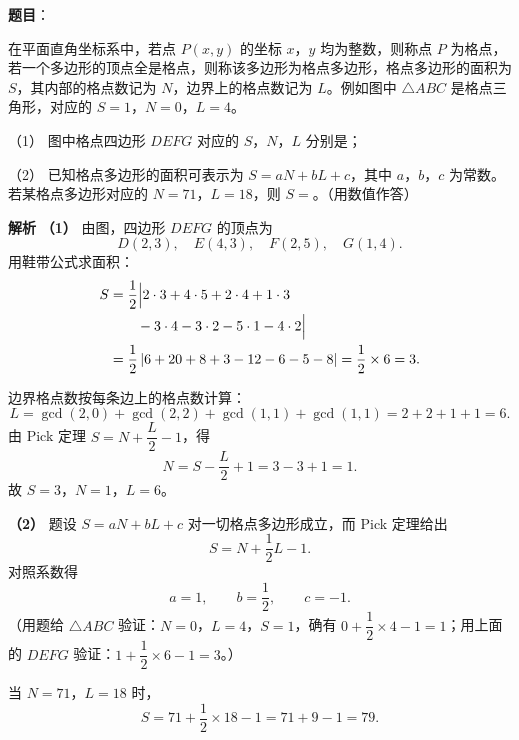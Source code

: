\begin{answer}

\textbf{题目}：

在平面直角坐标系中，若点 $P(x,y)$ 的坐标 $x$，$y$ 均为整数，则称点 $P$ 为格点，若一个多边形的顶点全是格点，则称该多边形为格点多边形，格点多边形的面积为 $S$，其内部的格点数记为 $N$，边界上的格点数记为 $L$。例如图中 $\triangle ABC$ 是格点三角形，对应的 $S=1$，$N=0$，$L=4$。
\nopagebreak[4]
\begin{center}\end{center}
\nopagebreak[4]
（1） 图中格点四边形 $DEFG$ 对应的 $S$，$N$，$L$ 分别是\gkblank{}；

（2） 已知格点多边形的面积可表示为 $S=aN+bL+c$，其中 $a$，$b$，$c$ 为常数。若某格点多边形对应的 $N=71$，$L=18$，则 $S=$\gkblank{}。（用数值作答）

\textbf{解析}
\textbf{（1）} 由图，四边形 $DEFG$ 的顶点为
\nopagebreak[4]
\[D(2,3),\quad E(4,3),\quad F(2,5),\quad G(1,4).\]
用鞋带公式求面积：
\nopagebreak[4]
\[\begin{aligned}
S&=\frac12\Bigl|2\cdot3+4\cdot5+2\cdot4+1\cdot3\\
&\qquad -3\cdot4-3\cdot2-5\cdot1-4\cdot2\Bigr|\\
&=\frac12\left|6+20+8+3-12-6-5-8\right|=\frac12\times6=3.
\end{aligned}\]

边界格点数按每条边上的格点数计算：
\nopagebreak[4]
\[L=\gcd(2,0)+\gcd(2,2)+\gcd(1,1)+\gcd(1,1)=2+2+1+1=6.\]
由 Pick 定理 $S=N+\dfrac L2-1$，得
\nopagebreak[4]
\[N=S-\frac L2+1=3-3+1=1.\]
故 $S=3$，$N=1$，$L=6$。

\textbf{（2）} 题设 $S=aN+bL+c$ 对一切格点多边形成立，而 Pick 定理给出
\nopagebreak[4]
\[S=N+\frac12L-1.\]
对照系数得
\nopagebreak[4]
\[a=1,\qquad b=\frac12,\qquad c=-1.\]
（用题给 $\triangle ABC$ 验证：$N=0$，$L=4$，$S=1$，确有 $0+\dfrac12\times4-1=1$；用上面的 $DEFG$ 验证：$1+\dfrac12\times6-1=3$。）

当 $N=71$，$L=18$ 时，
\nopagebreak[4]
\[S=71+\frac12\times18-1=71+9-1=79.\]



\end{answer}
